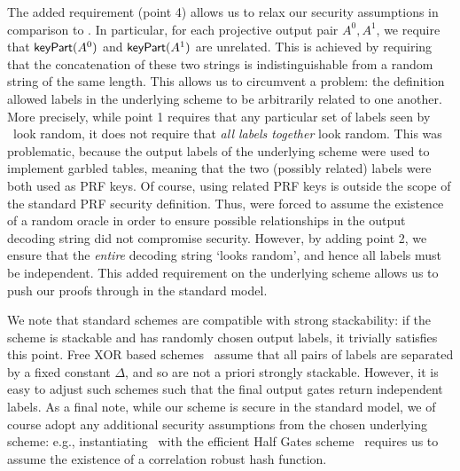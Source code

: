 The added requirement (point 4) allows us to relax
our security assumptions in comparison to \HK. In particular, for
each projective output pair $A^0, A^1$, we require that $\textsf{keyPart}(A^0)$ and
$\textsf{keyPart}(A^1)$ are unrelated.
This is achieved by requiring that the concatenation of these two
strings is indistinguishable from a random string of the same length.
This allows us to circumvent a problem: the \HK definition allowed labels in the underlying
scheme to be arbitrarily related to one another.
More precisely, while point 1 requires that any particular set of labels seen by
\E\ look random, it does not require that \emph{all labels together}
look random.
%
This was problematic, because the output labels of the
underlying scheme were used to implement garbled tables, meaning that
the two (possibly related) labels were both used as PRF keys.
%
Of course, using related PRF keys is outside the scope of the standard
PRF security definition.
%
Thus, \HK were forced to assume the existence of a random oracle in
order to ensure possible relationships in the output decoding string
did not compromise security.
%
However, by adding point 2, we ensure that the \emph{entire} decoding
string `looks random', and hence all labels must be independent.
This added requirement on the underlying scheme allows us to push our
proofs through in the standard model.


We note that standard schemes are compatible with strong stackability:
if the scheme is stackable and has randomly chosen output labels, it
trivially satisfies this point.
%
Free XOR based schemes~\cite{ICALP:KolSch08} assume that all
pairs of labels are separated by a fixed constant $\Delta$, and so
are not a priori strongly stackable. However, it is easy to adjust such
schemes such that the final output gates return independent labels.
%
As a final note, while our scheme is secure in the standard model, we
of course adopt any additional security assumptions from the chosen
underlying scheme: e.g., instantiating \ourscheme\ with the efficient
Half Gates scheme~\cite{EPRINT:ZahRosEva14} requires us to assume the
existence of a correlation robust hash function.

